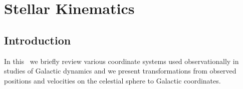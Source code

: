
\chapter{Stellar Kinematics}

\section{Introduction}

In this \appendixname\ we briefly review various coordinate systems
used observationally in studies of Galactic dynamics and we present
transformations from observed positions and velocities on the
celestial sphere to Galactic coordinates.


